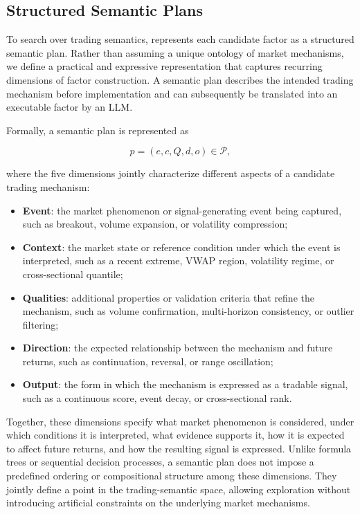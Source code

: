 \subsection{Structured Semantic Plans}

To search over trading semantics, \method{} represents each candidate
factor as a structured semantic plan. Rather than assuming a unique
ontology of market mechanisms, we define a practical and expressive
representation that captures recurring dimensions of factor
construction. A semantic plan describes the intended trading mechanism
before implementation and can subsequently be translated into an
executable factor by an LLM.

Formally, a semantic plan is represented as

\[
p=(e,c,Q,d,o)\in\mathcal{P},
\]

where the five dimensions jointly characterize different aspects of a
candidate trading mechanism:

\begin{itemize}[leftmargin=12pt, nosep]
  \item \textbf{Event}: the market phenomenon or signal-generating event
        being captured, such as breakout, volume expansion, or volatility
        compression;

  \item \textbf{Context}: the market state or reference condition under
        which the event is interpreted, such as a recent extreme, VWAP
        region, volatility regime, or cross-sectional quantile;

  \item \textbf{Qualities}: additional properties or validation criteria
        that refine the mechanism, such as volume confirmation,
        multi-horizon consistency, or outlier filtering;

  \item \textbf{Direction}: the expected relationship between the
        mechanism and future returns, such as continuation, reversal, or
        range oscillation;

  \item \textbf{Output}: the form in which the mechanism is expressed as
        a tradable signal, such as a continuous score, event decay, or
        cross-sectional rank.
\end{itemize}

Together, these dimensions specify what market phenomenon is considered,
under which conditions it is interpreted, what evidence supports it, how
it is expected to affect future returns, and how the resulting signal is
expressed. Unlike formula trees or sequential decision processes, a
semantic plan does not impose a predefined ordering or compositional
structure among these dimensions. They jointly define a point in the
trading-semantic space, allowing exploration without introducing
artificial constraints on the underlying market mechanisms.

